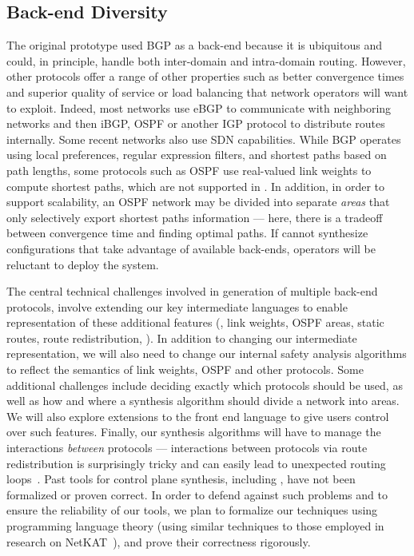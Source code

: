 \subsection{Back-end Diversity}
\label{sec:diversity}

The original \Propane prototype used BGP as a back-end because it is ubiquitous and
could, in principle, handle both inter-domain and 
intra-domain routing.  However, other protocols offer a range of other properties
such as better convergence times and superior quality of service or load balancing that network operators 
will want to exploit.  
%
Indeed, most networks use
eBGP to communicate with neighboring networks and 
then iBGP, OSPF or another IGP protocol to distribute routes internally.
Some recent networks also use SDN capabilities.
While BGP operates using local preferences, regular expression filters,
and shortest paths based on path lengths, some protocols such as OSPF
use real-valued link weights to compute shortest paths, which are not
supported in \Propane.  In addition, in order to support scalability, 
an OSPF network may be divided into separate \emph{areas} that only selectively
export shortest paths information --- here, there is a tradeoff between 
convergence time and finding optimal paths.  
If \Name cannot synthesize configurations that take advantage of available
back-ends, operators will be reluctant to deploy the system.

The central technical challenges involved in generation of multiple back-end protocols, involve
extending our key intermediate languages to enable representation 
of these additional features (\eg, link weights, OSPF areas, static routes,
route redistribution, \etc).  
In addition to changing our intermediate representation, we will also need to 
change our internal safety analysis algorithms to reflect the semantics of 
link weights, OSPF and other protocols.
Some additional challenges include deciding exactly which protocols should be used,
as well as how and where
a synthesis algorithm should divide a network into areas.  We will also
explore extensions to the \Name front end language to give users
control over such features.
Finally, our synthesis algorithms will have to manage the interactions
\emph{between} protocols --- interactions between protocols via route redistribution
is surprisingly tricky and can easily lead to unexpected routing loops~\cite{cisco-route-redistribution}.
Past tools for control plane synthesis, including \Propane, have not been formalized or proven correct. 
In order to defend against such problems and to ensure the reliability of our tools, we plan to formalize 
our techniques using programming language
theory (using similar techniques to those employed in research on NetKAT~\cite{netkat}), and prove their correctness
rigorously.

